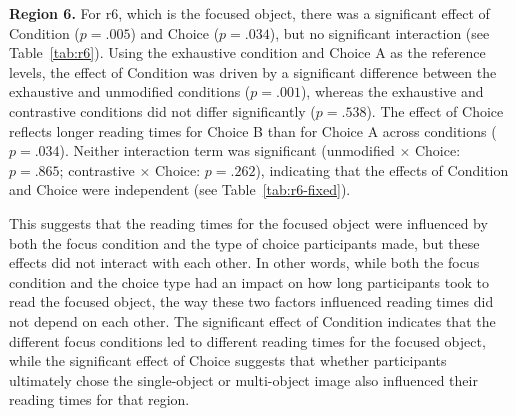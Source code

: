 \documentclass[ruler]{CUP-JNL-LIN}%
\begin{document}
\noindent \textbf{Region 6.} For r6, which is the focused object, there was a significant effect of Condition ($p=.005$) and Choice ($p=.034$), but no significant interaction (see Table~\ref{tab:r6}). Using the exhaustive condition and Choice A as the reference levels, the effect of Condition was driven by a significant difference between the exhaustive and unmodified conditions ($p=.001$), whereas the exhaustive and contrastive conditions did not differ significantly ($p=.538$). The effect of Choice reflects longer reading times for Choice B than for Choice A across conditions ($p=.034$). Neither interaction term was significant (unmodified $\times$ Choice: $p=.865$; contrastive $\times$ Choice: $p=.262$), indicating that the effects of Condition and Choice were independent (see Table~\ref{tab:r6-fixed}).


This suggests that the reading times for the focused object were influenced by both the focus condition and the type of choice participants made, but these effects did not interact with each other. In other words, while both the focus condition and the choice type had an impact on how long participants took to read the focused object, the way these two factors influenced reading times did not depend on each other. The significant effect of Condition indicates that the different focus conditions led to different reading times for the focused object, while the significant effect of Choice suggests that whether participants ultimately chose the single-object or multi-object image also influenced their reading times for that region.



\end{document}
